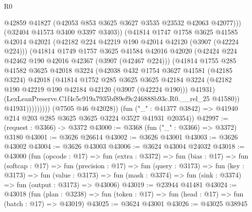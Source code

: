\begin{lexlean}{R0}
\begin{coremodule}
                          @42859
                          @41827
                          (@42053 @853 @3625 @3627 @3535 @23532 @42063 @42077)))
                      (@32404 @41573 @3400 @3397 @3403))
                    (@41814
                      @1747
                      @1758
                      @3625
                      @41585
                      @42014
                      @42021
                      (@42182 @224 @42219 @190 @42014 @42120 (@3907 (@42224 @224)))
                      (@41814
                        @1749
                        @1757
                        @3625
                        @41584
                        @42016
                        @42020
                        (@42424 @224 @42462 @190 @42016 @42367 (@3907 (@42467 @224)))
                        (@41814
                          @1755
                          @285
                          @41582
                          @3625
                          @42018
                          @3224
                          (@42038
                            @432
                            @1754
                            @3627
                            @41581
                            (@42185 @3224)
                            @42018
                            (@41814
                              @1752
                              @285
                              @3625
                              @3625
                              @42184
                              @3224
                              (@42182 @190 @42219 @190 @42184 @42120 (@3907 (@42224 @190)))
                              @41931)
                            (LexLeanPreserve.C1f4c5c919a7935bf89ef9c246888b93c.R0.__rel_25 @41580))
                          @41931)))))))))
        (@7505 @46 @42028))
      (fun ("_" : @41377 @3842) => @41940 @214 @203 @285 @3625 @3625 @3224 @3527 @41931 @20354))
@42997 := (request : @3366) -> @3372
@43000 := @3368 (fun ("_" : @3366) => @3372) @3180
@43001 := @3626 @26614
@43002 := @3626 @43001
@43003 := @3626 @43002
@43004 := @3626 @43003
@43006 := @3624 @43004 @24032
@43018 := @43000
    (fun (opcode : @17) =>
    fun (extra : @3372) =>
    fun (bias : @17) =>
    fun (softcap : @17) =>
    fun (precision : @17) =>
    fun (query : @3173) =>
    fun (key : @3173) =>
    fun (value : @3173) =>
    fun (mask : @3374) => fun (sink : @3374) => fun (output : @3173) => @43006)
@43019 := @23944 @41481
@43024 := @43018
    (fun (plan : @3238) => fun (token : @17) => fun (head : @17) => fun (batch : @17) => @43019)
@43025 := @3624 @43001
@43026 := @43025 @38945

\end{coremodule}
\end{lexlean}
